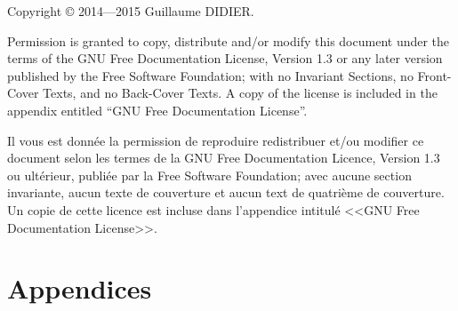 
\title{\TSwiftTitle}

\newcommand{\TSwiftRoot}[0]{.} %


\frontmatter
\maketitle
\begin{otherlanguage}{english}
Copyright \copyright{}  2014---2015 Guillaume DIDIER.

Permission is granted to copy, distribute and/or modify this document
under the terms of the GNU Free Documentation License, Version 1.3
or any later version published by the Free Software Foundation;
with no Invariant Sections, no Front-Cover Texts, and no Back-Cover Texts.
A copy of the license is included in the appendix entitled ``GNU
Free Documentation License''.
\end{otherlanguage}

Il vous est donnée la permission de reproduire redistribuer et/ou modifier ce document selon les termes de la GNU Free Documentation Licence, Version 1.3 ou ultérieur, publiée par la Free Software Foundation; avec aucune section invariante, aucun texte de couverture et aucun text de quatrième de couverture.
Un copie de cette licence est incluse dans l'appendice intitulé <<GNU Free Documentation License>>.



\tableofcontents


\mainmatter


\appendix
\part*{Appendices}


\backmatter


